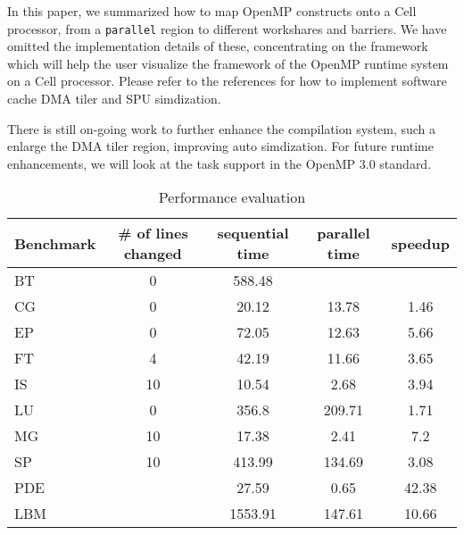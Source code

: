 In this paper, we summarized how to map OpenMP constructs onto a Cell
processor, from a \texttt{parallel} region to different workshares and
barriers. We have omitted the implementation details of these, concentrating on
the framework which will help the user visualize the framework of the OpenMP
runtime system on a Cell processor. Please refer to the references for how to
implement software cache DMA tiler and SPU simdization.

There is still on-going work to further enhance the compilation system, such a
enlarge the DMA tiler region, improving auto simdization. For future runtime
enhancements, we will look at the task support in the OpenMP 3.0 standard.

\begin{table}
  \begin{center}
    \begin{tabular}{|l|c|c|c|c|} \hline
      \bf Benchmark & \bf \# of lines changed & \bf sequential time & \bf parallel time & \bf speedup \\
      \hline
      \hline
      BT & 0 & 588.48 &  &  \\
      \hline
      CG & 0 & 20.12 & 13.78 & 1.46 \\
      \hline
      EP & 0 & 72.05 & 12.63 & 5.66 \\
      \hline
      FT & 4 & 42.19 & 11.66 & 3.65 \\
      \hline
      IS & 10 & 10.54 & 2.68 & 3.94 \\
      \hline
      LU & 0 & 356.8 & 209.71 & 1.71 \\
      \hline
      MG & 10 & 17.38 & 2.41 & 7.2 \\
      \hline
      SP & 10 & 413.99 & 134.69 & 3.08 \\
      \hline
      \hline
      PDE &  & 27.59 & 0.65 & 42.38 \\
      \hline
      LBM &  & 1553.91 & 147.61 & 10.66 \\
      \hline
    \end{tabular}
    \vspace{0.5cm}
    \caption{\label{performance}Performance evaluation}
  \end{center}
\end{table}



